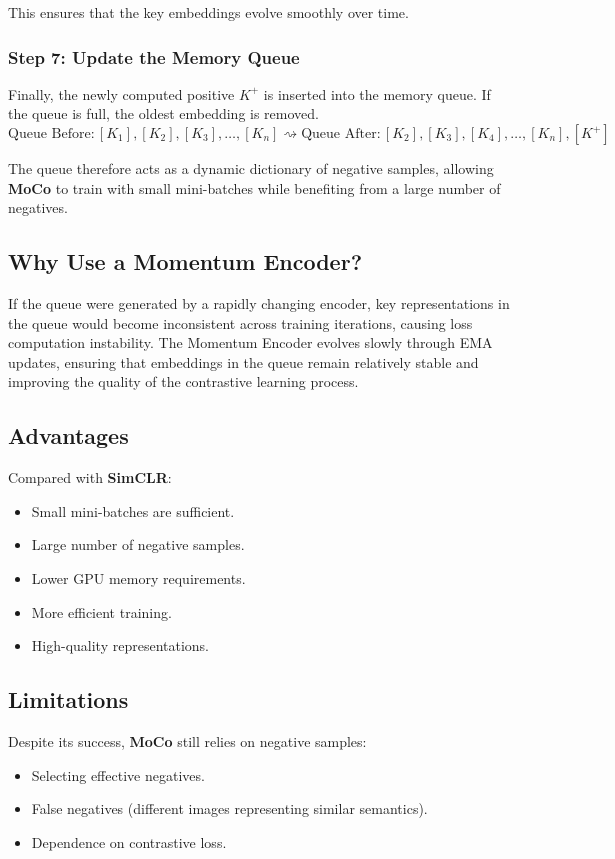 This ensures that the key embeddings evolve smoothly over time.

\subsubsection{Step 7: Update the Memory Queue}
Finally, the newly computed positive $K^+$ is inserted into the memory queue. If the queue is full, the oldest embedding is removed.
\[
\text{Queue Before}: [K_1], [K_2], [K_3], \dots, [K_n] \rightsquigarrow \text{Queue After}: [K_2], [K_3], [K_4], \dots, [K_n], [K^+]
\]

The queue therefore acts as a dynamic dictionary of negative samples, allowing \textbf{MoCo} to train with small mini-batches while benefiting from a large number of negatives.

\subsection{Why Use a Momentum Encoder?}

If the queue were generated by a rapidly changing encoder, key representations in the queue would become inconsistent across training iterations, causing loss computation instability. The Momentum Encoder evolves slowly through EMA updates, ensuring that embeddings in the queue remain relatively stable and improving the quality of the contrastive learning process.

\subsection{Advantages}

Compared with \textbf{SimCLR}:
\begin{itemize}
    \item Small mini-batches are sufficient.
    \item Large number of negative samples.
    \item Lower GPU memory requirements.
    \item More efficient training.
    \item High-quality representations.
\end{itemize}

\subsection{Limitations}

Despite its success, \textbf{MoCo} still relies on negative samples:
\begin{itemize}
    \item Selecting effective negatives.
    \item False negatives (different images representing similar semantics).
    \item Dependence on contrastive loss.
\end{itemize}


